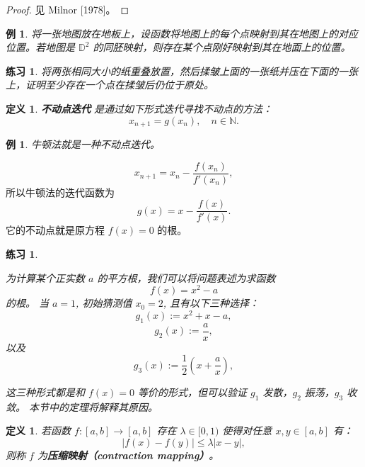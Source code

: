 \documentclass[a4paper]{ctexart}
\newtheorem{definition}[theorem]{定义} %
\newtheorem{example}[theorem]{例}
\newtheorem{exercise}[theorem]{练习}
\numberwithin{theorem}{section}
\numberwithin{equation}{section}
\numberwithin{figure}{section}
\numberwithin{remark}{section}
\begin{document}
\begin{proof}
见 Milnor [1978]。
\end{proof}

\begin{example}
将一张地图放在地板上，设函数将地图上的每个点映射到其在地图上的对应位置。若地图是 \( \mathbb{D}^2 \) 的同胚映射，则存在某个点刚好映射到其在地面上的位置。
\end{example}

\begin{exercise}
将两张相同大小的纸重叠放置，然后揉皱上面的一张纸并压在下面的一张上，证明至少存在一个点在揉皱后仍位于原处。
\end{exercise}

\begin{definition}
\textbf{不动点迭代} 是通过如下形式迭代寻找不动点的方法：
\begin{equation}
    \label{eq::fixed_point_iteration}
x_{n+1} = g(x_n), \quad n \in \mathbb{N}.
\end{equation}
\end{definition}

\begin{example}
牛顿法就是一种不动点迭代。
\end{example}

$$
x_{n + 1} = x_n - \frac{f(x_n)}{f'(x_n)},
$$
所以牛顿法的迭代函数为
$$
g(x) = x - \frac{f(x)}{f'(x)}.
$$
它的不动点就是原方程 \( f(x) = 0 \) 的根。



\begin{exercise}
    \label{exe::fixed_point_behavior}

为计算某个正实数 \( a \) 的平方根，我们可以将问题表述为求函数  
\[f(x) = x^2 - a\]  
的根。  
当 \( a = 1 \), 初始猜测值 \( x_0 = 2 \), 且有以下三种选择：  
\[g_1(x) := x^2 + x - a,\]  
\[g_2(x) := \frac{a}{x},\]  
以及  
\[g_3(x) := \frac{1}{2}\left(x + \frac{a}{x}\right),\]  

这三种形式都是和 $f(x) = 0$ 等价的形式，但可以验证 \( g_1 \) 发散，\( g_2 \) 振荡，\( g_3 \) 收敛。
本节中的定理将解释其原因。
\end{exercise}

\begin{definition}
    \label{def::contraction}
若函数 \( f : [a, b] \to [a, b] \) 存在 \( \lambda \in [0, 1) \) 使得对任意 \( x, y \in [a, b] \) 有：
\begin{equation}
|f(x) - f(y)| \leq \lambda |x - y|,
\end{equation}
则称 \( f \) 为\textbf{压缩映射（contraction mapping）}。
\end{definition}
\end{document}
